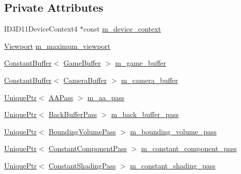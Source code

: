 \subsection*{Private Attributes}
\begin{DoxyCompactItemize}
\item 
I\+D3\+D11\+Device\+Context4 $\ast$const \hyperlink{classmage_1_1_renderer_ab4161386c4ddd51aa6d3299c10f1744a}{m\+\_\+device\+\_\+context}
\item 
\hyperlink{classmage_1_1_viewport}{Viewport} \hyperlink{classmage_1_1_renderer_a4a874bbe3cd4f19a16a65cca7bb93100}{m\+\_\+maximum\+\_\+viewport}
\item 
\hyperlink{classmage_1_1_constant_buffer}{Constant\+Buffer}$<$ \hyperlink{structmage_1_1_game_buffer}{Game\+Buffer} $>$ \hyperlink{classmage_1_1_renderer_abba23dce8a4946d352f901707900857b}{m\+\_\+game\+\_\+buffer}
\item 
\hyperlink{classmage_1_1_constant_buffer}{Constant\+Buffer}$<$ \hyperlink{structmage_1_1_camera_buffer}{Camera\+Buffer} $>$ \hyperlink{classmage_1_1_renderer_ac6ea5b2ff22e051400a693b3f98ef816}{m\+\_\+camera\+\_\+buffer}
\item 
\hyperlink{namespacemage_a3316d7143a973e37adf1110f2e80ca31}{Unique\+Ptr}$<$ \hyperlink{classmage_1_1_a_a_pass}{A\+A\+Pass} $>$ \hyperlink{classmage_1_1_renderer_a275986047921b355d94b1a7111df6665}{m\+\_\+aa\+\_\+pass}
\item 
\hyperlink{namespacemage_a3316d7143a973e37adf1110f2e80ca31}{Unique\+Ptr}$<$ \hyperlink{classmage_1_1_back_buffer_pass}{Back\+Buffer\+Pass} $>$ \hyperlink{classmage_1_1_renderer_a21db5f4d584b3325911d132d0022b856}{m\+\_\+back\+\_\+buffer\+\_\+pass}
\item 
\hyperlink{namespacemage_a3316d7143a973e37adf1110f2e80ca31}{Unique\+Ptr}$<$ \hyperlink{classmage_1_1_bounding_volume_pass}{Bounding\+Volume\+Pass} $>$ \hyperlink{classmage_1_1_renderer_a36271439a6217d1fd9b9162f5d90b738}{m\+\_\+bounding\+\_\+volume\+\_\+pass}
\item 
\hyperlink{namespacemage_a3316d7143a973e37adf1110f2e80ca31}{Unique\+Ptr}$<$ \hyperlink{classmage_1_1_constant_component_pass}{Constant\+Component\+Pass} $>$ \hyperlink{classmage_1_1_renderer_a263748ea2ded028b1885f122e62caf39}{m\+\_\+constant\+\_\+component\+\_\+pass}
\item 
\hyperlink{namespacemage_a3316d7143a973e37adf1110f2e80ca31}{Unique\+Ptr}$<$ \hyperlink{classmage_1_1_constant_shading_pass}{Constant\+Shading\+Pass} $>$ \hyperlink{classmage_1_1_renderer_af6536c9471209a50c8630e0b49a45177}{m\+\_\+constant\+\_\+shading\+\_\+pass}

\end{DoxyCompactItemize}
